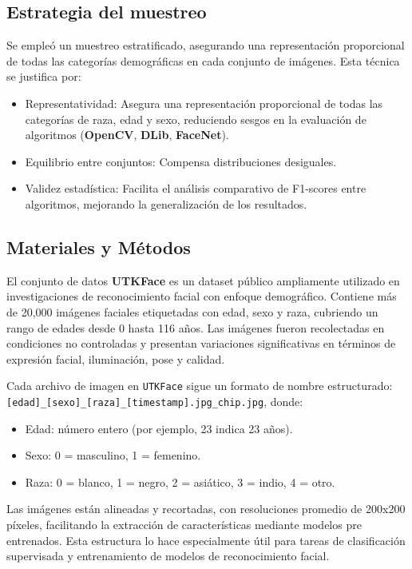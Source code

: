 \subsection{Estrategia del muestreo}

Se empleó un muestreo estratificado, asegurando una representación proporcional de todas las categorías demográficas en cada conjunto de imágenes. Esta técnica se justifica por:

\begin{itemize}
  \item Representatividad: Asegura una representación proporcional de todas las categorías de raza, edad y sexo, reduciendo sesgos en la evaluación de algoritmos (\textbf{OpenCV}, \textbf{DLib}, \textbf{FaceNet}).
  \item Equilibrio entre conjuntos: Compensa distribuciones desiguales.
  \item Validez estadística: Facilita el análisis comparativo de F1-scores entre algoritmos, mejorando la generalización de los resultados.
\end{itemize}

\subsection{Materiales y Métodos}

El conjunto de datos \textbf{UTKFace} es un dataset público ampliamente utilizado en investigaciones de reconocimiento facial con enfoque demográfico. Contiene más de 20,000 imágenes faciales etiquetadas con edad, sexo y raza, cubriendo un rango de edades desde 0 hasta 116 años. Las imágenes fueron recolectadas en condiciones no controladas y presentan variaciones significativas en términos de expresión facial, iluminación, pose y calidad.

Cada archivo de imagen en \texttt{UTKFace} sigue un formato de nombre estructurado:\newline
\texttt{[edad]\_[sexo]\_[raza]\_[timestamp].jpg\_chip.jpg}, donde:

\begin{itemize}
  \item Edad: número entero (por ejemplo, 23 indica 23 años).
  \item Sexo: 0 = masculino, 1 = femenino.
  \item Raza: 0 = blanco, 1 = negro, 2 = asiático, 3 = indio, 4 = otro.
\end{itemize}

Las imágenes están alineadas y recortadas, con resoluciones promedio de 200x200 píxeles, facilitando la extracción de características mediante modelos pre entrenados. Esta estructura lo hace especialmente útil para tareas de clasificación supervisada y entrenamiento de modelos de reconocimiento facial.

